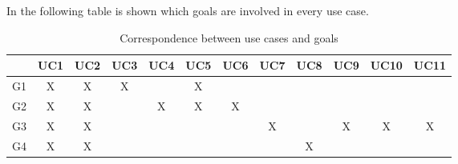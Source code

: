 \documentclass[a4paper]{report}
\begin{document}
In the following table is shown which goals are involved in every use case.
\begin{table}[H]  
  \centering
  \begin{tabular}{|c|c|c|c|c|c|c|c|c|c|c|c|}
    \cline{2-12}
    \multicolumn{1}{c|}{} & UC1 & UC2 & UC3 & UC4 & UC5 & UC6 & UC7 & UC8 & UC9 & UC10 & UC11 \\ \hline
    G1 & X & X & X &  & X &  &  &  &  &  &  \\ \hline
    G2 & X & X &  & X & X & X &  &  &  &  &  \\ \hline
    G3 & X & X &  &  &  &  & X &  & X & X & X \\ \hline
    G4 & X & X &  &  &  &  &  & X &  &  &  \\ \hline
  \end{tabular}
  \caption{Correspondence between use cases and goals}
\end{table}
\end{document}
